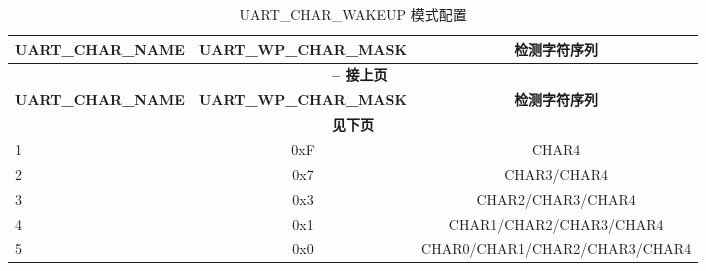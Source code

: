 \begin{longtable}[c]{|l|c|c|}
\caption{UART\_CHAR\_WAKEUP 模式配置}
\label{tab:uart-char-wakeup-cfg} \\
    \hline
    \rowcolor{lightgray}
    \textbf{UART\_CHAR\_NAME} & \textbf{UART\_WP\_CHAR\_MASK} & \textbf{检测字符序列} \\\hline
    \endfirsthead

    \multicolumn{3}{c}{\bfseries \tablename\ \thetable{} -- 接上页}\\\hline
    \rowcolor{lightgray}
    \textbf{UART\_CHAR\_NAME} & \textbf{UART\_WP\_CHAR\_MASK} & \textbf{检测字符序列} \\\hline
    \endhead

    \multicolumn{3}{c}{\textbf{见下页}} \\
    \endfoot
    \endlastfoot

1 & 0xF & CHAR4 \\\hline
2 & 0x7 & CHAR3/CHAR4
 \\\hline
3 & 0x3 & CHAR2/CHAR3/CHAR4
 \\\hline
4 & 0x1 & CHAR1/CHAR2/CHAR3/CHAR4
 \\\hline
5 & 0x0 & CHAR0/CHAR1/CHAR2/CHAR3/CHAR4
 \\\hline
\end{longtable}
